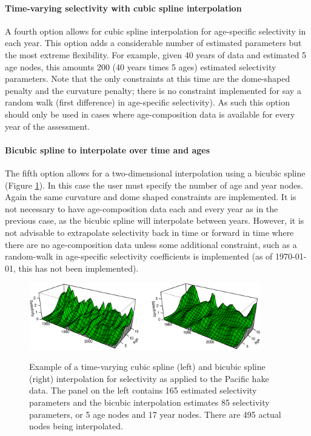 \begin{multicols}{2}
\paragraph{Time-varying selectivity with cubic spline interpolation} A fourth option allows for cubic spline interpolation for age-specific selectivity  in each year.  This option adds a considerable number of estimated parameters but the most extreme flexibility.  For example, given 40 years of data and estimated 5 age nodes, this amounts 200 (40 years times 5 ages) estimated selectivity parameters.  Note that the only constraints at this time are the dome-shaped penalty and the curvature penalty; there is no constraint implemented for say a random walk (first difference) in age-specific selectivity).  As such this option should only be used in cases where age-composition data is available for every year of the assessment.

\paragraph{Bicubic spline to interpolate over time and ages}  The fifth option allows for a two-dimensional interpolation using a bicubic spline (Figure \ref{Fig3}).  In this case the user must specify the number of age and year nodes.  Again the same curvature and dome shaped constraints are implemented.  It is not necessary to have age-composition data each and every year as in the previous case, as the bicubic spline will interpolate between years.  However, it is not advisable to extrapolate selectivity back in time or forward in time where there are no age-composition data unless some additional constraint, such as a random-walk in age-specific selectivity coefficients is implemented (as of \today, this has not been implemented).

\begin{figure}[!tbp]
	\centering
	\includegraphics[width=0.9\textwidth]{iscamFigs/BicubicEg.eps}\\
	\caption{Example of a time-varying cubic spline (left) and bicubic spline (right) interpolation for selectivity as applied to the Pacific hake data. The panel on the left contains 165 estimated selectivity parameters and the bicubic interpolation estimates 85 selectivity parameters, or 5 age nodes and 17 year nodes. There are 495 actual nodes being interpolated.}\label{Fig3}
\end{figure}
\end{multicols}

